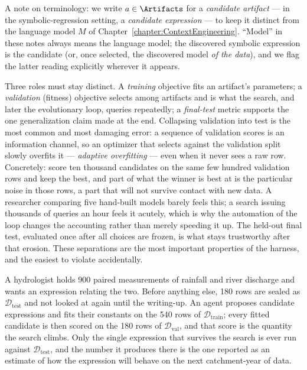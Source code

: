 A note on terminology: we write $a \in \Artifacts$ for a \emph{candidate artifact} --- in the symbolic-regression setting, a \emph{candidate expression} --- to keep it distinct from the language model $M$ of Chapter~\ref{chapter:ContextEngineering}.
``Model'' in these notes always means the language model; the discovered symbolic expression is the candidate (or, once selected, the discovered model \emph{of the data}), and we flag the latter reading explicitly wherever it appears.

Three roles must stay distinct.
A \emph{training} objective fits an artifact's parameters; a \emph{validation} (fitness) objective selects among artifacts and is what the search, and later the evolutionary loop, queries repeatedly; a \emph{final-test} metric supports the one generalization claim made at the end.
Collapsing validation into test is the most common and most damaging error: a sequence of validation scores is an information channel, so an optimizer that selects against the validation split slowly overfits it --- \emph{adaptive overfitting} --- even when it never sees a raw row.
Concretely: score ten thousand candidates on the same few hundred validation rows and keep the best, and part of what the winner is best at is the particular noise in those rows, a part that will not survive contact with new data.
A researcher comparing five hand-built models barely feels this; a search issuing thousands of queries an hour feels it acutely, which is why the automation of the loop changes the accounting rather than merely speeding it up.
The held-out final test, evaluated once after all choices are frozen, is what stays trustworthy after that erosion.
These separations are the most important properties of the harness, and the easiest to violate accidentally.

\begin{example}
A hydrologist holds 900 paired measurements of rainfall and river discharge and wants an expression relating the two.
Before anything else, 180 rows are sealed as $\mathcal{D}_{\mathrm{test}}$ and not looked at again until the writing-up.
An agent proposes candidate expressions and fits their constants on the 540 rows of $\mathcal{D}_{\mathrm{train}}$; every fitted candidate is then scored on the 180 rows of $\mathcal{D}_{\mathrm{val}}$, and that score is the quantity the search climbs.
Only the single expression that survives the search is ever run against $\mathcal{D}_{\mathrm{test}}$, and the number it produces there is the one reported as an estimate of how the expression will behave on the next catchment-year of data.
\end{example}

